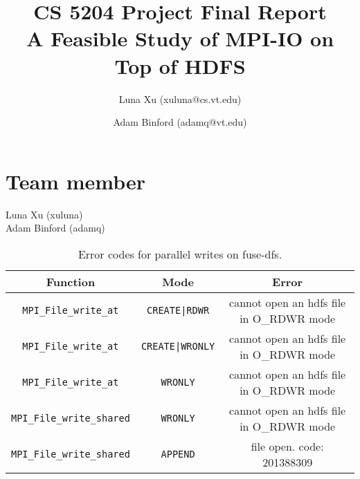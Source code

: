 \documentclass[11pt,titlepage]{article}
\author{Luna Xu (xuluna@cs.vt.edu) \and Adam Binford (adamq@vt.edu)}
\title{CS 5204 Project Final Report \\ A Feasible Study of MPI-IO on Top of HDFS}
\newcommand{\otoprule}{\midrule[\heavyrulewidth]}
\begin{document}
\maketitle

\section{Team member}
Luna Xu (xuluna)\\
Adam Binford (adamq)






\begin{table}[t]
	\centering
	\small
	\begin{tabular}{ccc}
		\toprule
	{\bf Function} &{\bf Mode} &{\bf Error} \\\otoprule
		{\tt MPI\_File\_write\_at} & {\tt CREATE|RDWR} & cannot open an
		hdfs file in O\_RDWR mode \\
		{\tt MPI\_File\_write\_at} & {\tt CREATE|WRONLY} & cannot open an
		hdfs file in O\_RDWR mode \\
		{\tt MPI\_File\_write\_at} & {\tt WRONLY} & cannot open an
		hdfs file in O\_RDWR mode \\
		{\tt MPI\_File\_write\_shared} & {\tt WRONLY} & cannot open an
		hdfs file in O\_RDWR mode \\
		{\tt MPI\_File\_write\_shared} & {\tt APPEND} &file open. code:
		201388309\\\bottomrule 
	\end{tabular}
	\caption{\small Error codes for parallel writes on fuse-dfs.}
	\label{tab:write}
\end{table}
{}

\end{document}
